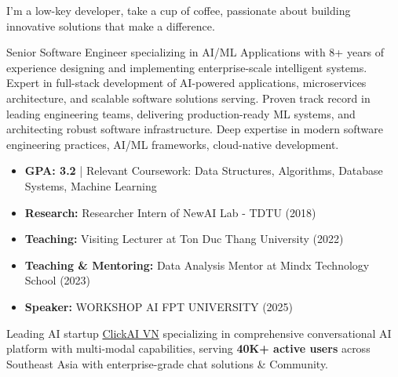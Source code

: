 \documentclass[10pt,a4paper,ragged2e,withhyper]{altacv}
\begin{document}


\makecvheader

\begin{minipage}{\linewidth}
\justifying
I'm a low-key developer, take a cup of coffee, passionate about building innovative solutions that make a difference.

Senior Software Engineer specializing in AI/ML Applications with 8+ years of experience designing and implementing enterprise-scale intelligent systems. Expert in full-stack development of AI-powered applications, microservices architecture, and scalable software solutions serving. Proven track record in leading engineering teams, delivering production-ready ML systems, and architecting robust software infrastructure. Deep expertise in modern software engineering practices, AI/ML frameworks, cloud-native development.
\end{minipage}

\begin{itemize}
	\item \textbf{GPA: 3.2} | Relevant Coursework: Data Structures, Algorithms, Database Systems, Machine Learning
  \item \textbf{Research:} Researcher Intern of NewAI Lab - TDTU (2018)
  \item \textbf{Teaching:} Visiting Lecturer at Ton Duc Thang University (2022)
  \item \textbf{Teaching \& Mentoring:} Data Analysis Mentor at Mindx Technology School (2023)
  \item \textbf{Speaker:} WORKSHOP AI \– FPT UNIVERSITY (2025)
\end{itemize}



\begin{minipage}{\linewidth}
\justifying
Leading AI startup \href{http://clickai.vn}{ClickAI VN} specializing in comprehensive conversational AI platform with multi-modal capabilities, serving \textbf{40K+ active users} across Southeast Asia with enterprise-grade chat solutions \& Community.
\end{minipage}
\end{document}
